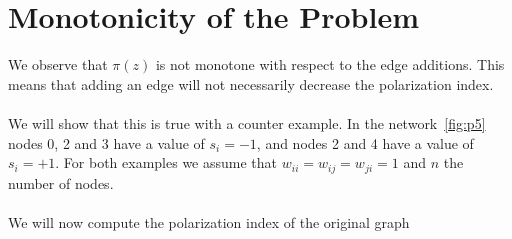 \section{Monotonicity of the Problem}
\label{sec:monotonicity}
\vspace{20pt}
We observe that $\pi(z)$ is not monotone with respect to the edge additions. This means that adding an edge will not necessarily decrease the polarization index. 
\\
\\
We will  show that this is true with a counter example. In the network~\ref{fig:p5} nodes 0, 2 and 3 have a value of $s_i=-1$, and nodes 2 and 4 have a value of $s_i=+1$. For both examples we assume that $w_{ii}=w_{ij}=w_{ji}=1$ and $n$ the number of nodes.
\\
\\
We will now compute the polarization index of the original graph
\\
\\
\\
\\

